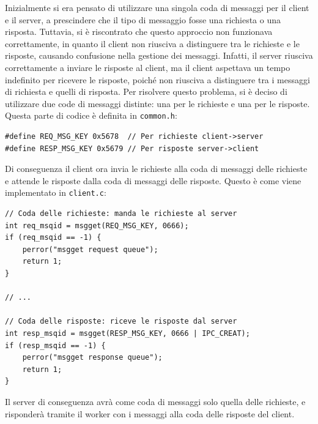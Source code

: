 \documentclass[a4paper]{article}
\begin{document}
Inizialmente si era pensato di utilizzare una singola coda di messaggi per il client e il server,
a prescindere che il tipo di messaggio fosse una richiesta o una risposta.
Tuttavia, si è riscontrato che questo approccio non funzionava correttamente, in quanto il client
non riusciva a distinguere tra le richieste e le risposte, causando confusione nella gestione dei messaggi.
Infatti, il server riusciva correttamente a inviare le risposte al client, ma il client aspettava
un tempo indefinito per ricevere le risposte, poiché non riusciva a distinguere tra i messaggi di richiesta e quelli di risposta.
Per risolvere questo problema, si è deciso di utilizzare due code di messaggi distinte: una per le richieste e una per le risposte.
Questa parte di codice è definita in \texttt{common.h}:
\begin{verbatim}
#define REQ_MSG_KEY 0x5678  // Per richieste client->server
#define RESP_MSG_KEY 0x5679 // Per risposte server->client
\end{verbatim}
\noindent
Di conseguenza il client ora invia le richieste alla coda di messaggi delle richieste e 
attende le risposte dalla coda di messaggi delle risposte. Questo è come viene implementato in \texttt{client.c}:
\begin{verbatim}
// Coda delle richieste: manda le richieste al server
int req_msqid = msgget(REQ_MSG_KEY, 0666); 
if (req_msqid == -1) {
    perror("msgget request queue");
    return 1;
}

// ...

// Coda delle risposte: riceve le risposte dal server
int resp_msqid = msgget(RESP_MSG_KEY, 0666 | IPC_CREAT); 
if (resp_msqid == -1) {
    perror("msgget response queue");
    return 1;
}
\end{verbatim}
\noindent
Il server di conseguenza avrà come coda di messaggi solo quella delle richieste, e risponderà
tramite il worker con i messaggi alla coda delle risposte del client.
\end{document}
